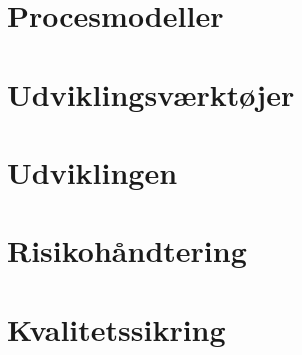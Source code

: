 \chapter{Procesmodeller}\label{ch:procesmodeller}




\chapter{Udviklingsværktøjer}\label{ch:udviklingsvaerktoejer}



\chapter{Udviklingen}\label{ch:udviklingen}



\chapter{Risikohåndtering}\label{ch:risikohaandtering}


\chapter{Kvalitetssikring}\label{ch:kvalitetssikring}




